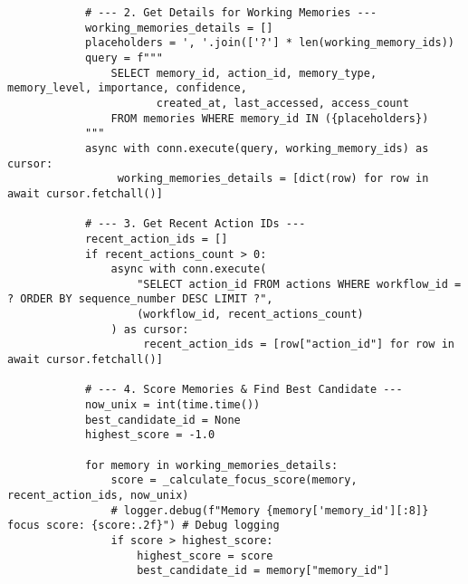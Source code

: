 \documentclass[12pt,a4paper]{article}
\begin{document}
\begin{pageablecode}
\begin{verbatim}
            # --- 2. Get Details for Working Memories ---
            working_memories_details = []
            placeholders = ', '.join(['?'] * len(working_memory_ids))
            query = f"""
                SELECT memory_id, action_id, memory_type, memory_level, importance, confidence,
                       created_at, last_accessed, access_count
                FROM memories WHERE memory_id IN ({placeholders})
            """
            async with conn.execute(query, working_memory_ids) as cursor:
                 working_memories_details = [dict(row) for row in await cursor.fetchall()]

            # --- 3. Get Recent Action IDs ---
            recent_action_ids = []
            if recent_actions_count > 0:
                async with conn.execute(
                    "SELECT action_id FROM actions WHERE workflow_id = ? ORDER BY sequence_number DESC LIMIT ?",
                    (workflow_id, recent_actions_count)
                ) as cursor:
                     recent_action_ids = [row["action_id"] for row in await cursor.fetchall()]

            # --- 4. Score Memories & Find Best Candidate ---
            now_unix = int(time.time())
            best_candidate_id = None
            highest_score = -1.0

            for memory in working_memories_details:
                score = _calculate_focus_score(memory, recent_action_ids, now_unix)
                # logger.debug(f"Memory {memory['memory_id'][:8]} focus score: {score:.2f}") # Debug logging
                if score > highest_score:
                    highest_score = score
                    best_candidate_id = memory["memory_id"]


\end{verbatim}
\end{pageablecode}
\end{document}
